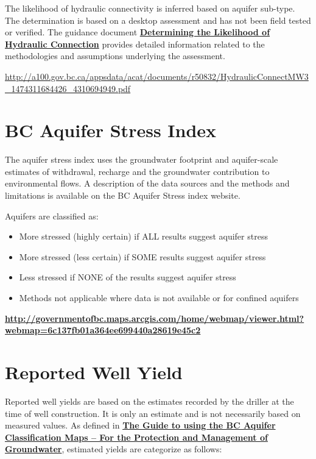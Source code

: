 \documentclass[11pt,]{article}
\providecommand{\tightlist}{%
  \setlength{\itemsep}{0pt}\setlength{\parskip}{0pt}}
\let\oldhref\href
\renewcommand{\href}[2]{\oldhref{#1}{\bfseries#2}}
\begin{document}
The likelihood of hydraulic connectivity is inferred based on aquifer
sub-type. The determination is based on a desktop assessment and has not
been field tested or verified. The guidance document
\href{http://a100.gov.bc.ca/appsdata/acat/documents/r50832/HydraulicConnectMW3_1474311684426_4310694949.pdf}{Determining
the Likelihood of Hydraulic Connection} provides detailed information
related to the methodologies and assumptions underlying the assessment.

\url{http://a100.gov.bc.ca/appsdata/acat/documents/r50832/HydraulicConnectMW3_1474311684426_4310694949.pdf}

\section{BC Aquifer Stress Index}\label{bc-aquifer-stress-index}

The aquifer stress index uses the groundwater footprint and
aquifer-scale estimates of withdrawal, recharge and the groundwater
contribution to environmental flows. A description of the data sources
and the methods and limitations is available on the BC Aquifer Stress
index website.

Aquifers are classified as:

\begin{itemize}
\tightlist
\item
  More stressed (highly certain) if ALL results suggest aquifer stress
\item
  More stressed (less certain) if SOME results suggest aquifer stress
\item
  Less stressed if NONE of the results suggest aquifer stress
\item
  Methods not applicable where data is not available or for confined
  aquifers
\end{itemize}

\href{http://governmentofbc.maps.arcgis.com/home/webmap/viewer.html?webmap=6c137fb01a364ee699440a28619e45c2}{http://governmentofbc.maps.arcgis.com/home/webmap/viewer.html?\\
webmap=6c137fb01a364ee699440a28619e45c2}

\section{Reported Well Yield}\label{reported-well-yield}

Reported well yields are based on the estimates recorded by the driller
at the time of well construction. It is only an estimate and is not
necessarily based on measured values. As defined in
\href{http://www.env.gov.bc.ca/wsd/plan_protect_sustain/groundwater/aquifers/reports/aquifer_maps.pdf}{The
Guide to using the BC Aquifer Classification Maps -- For the Protection
and Management of Groundwater}, estimated yields are categorize as
follows:
\end{document}
